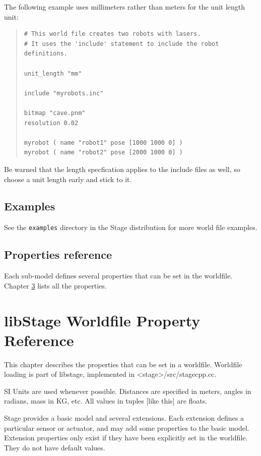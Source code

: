 \documentclass[letter,11pt,twoside]{report}
\begin{document}
\noindent The following example uses millimeters rather than meters
for the unit length unit:
\begin{quote}
\begin{verbatim}
# This world file creates two robots with lasers.
# It uses the 'include' statement to include the robot definitions.

unit_length "mm"

include "myrobots.inc"

bitmap "cave.pnm"
resolution 0.02

myrobot ( name "robot1" pose [1000 1000 0] )
myrobot ( name "robot2" pose [2000 1000 0] )
\end{verbatim}
\end{quote}
Be warned that the length specfication applies to the include files as well,
so choose a unit length early and stick to it.

\section{Examples}

See the {\tt examples} directory in the Stage distribution for more
world file examples.

\section{Properties reference}
Each sub-model defines several properties that can be set in the
worldfile. Chapter \ref{chap:propref} lists all the properties.


\chapter{libStage Worldfile Property Reference}
\label{chap:propref}

This chapter describes the properties that can be set in a
worldfile. Worldfile loading is part of libstage, implemented in
<stage>/src/stagecpp.cc.

SI Units are used whenever possible. Distances are specified in
meters, angles in radians, mass in KG, etc. All values in tuples [like
this] are floats.

Stage provides a basic model and several extensions. Each extension
defines a particular sensor or actuator, and may add some properties
to the basic model. Extension properties only exist if they have
been explicitly set in the worldfile. They do not have default values.
\end{document}
